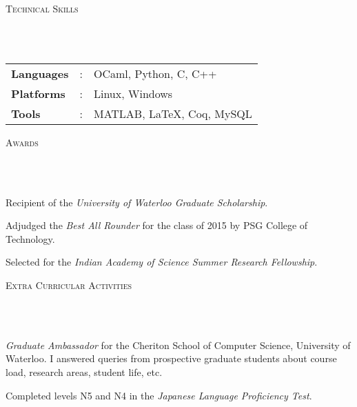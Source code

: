 \documentclass{article}
\newcommand{\header}[1]{{
\hspace*{-15pt}\vspace*{6pt} \textsc{#1}} \vspace*{-6pt} 
\lineunder
}
\newcommand{\lineunder}{
\vspace*{-8pt} \\ \hspace*{-18pt} 
\hrulefill \\
}
\renewcommand{\labelitemii}{
$\vcenter{\hbox{\tiny$\bullet$}}$\hspace*{-3pt}
}
\newenvironment{bullet-list-major}{
\begin{list}{\labelitemii}{\setlength\leftmargin{3pt} 
\topsep 0pt \itemsep -2pt}}{\vspace*{4pt}\end{list}
}
\begin{document}
\vspace*{4pt}%
\header{Technical Skills}
\begin{tabular}{l l l}

\textbf{Languages}&: & OCaml, Python, C, C++\\
\textbf{Platforms}&:  & Linux, Windows\\
\textbf{Tools}&:     &MATLAB, \LaTeX, Coq, MySQL
\end{tabular}


\vspace*{4pt}%
\header{Awards}
    \begin{bullet-list-major}
    \item Recipient of the \textit{University of Waterloo Graduate Scholarship}.
    \item Adjudged the \textit{Best All Rounder} for the class of 2015 by PSG College of
        Technology. 
    \item Selected for the \textit{Indian Academy of Science Summer Research
            Fellowship}.
    \end{bullet-list-major}

\vspace*{4pt}%
\header{Extra Curricular Activities}
    \begin{bullet-list-major}
    \item \textit{Graduate Ambassador} for the Cheriton School of Computer Science,
        University of Waterloo. I answered queries from prospective graduate
        students about course load, research areas, student life, etc.
    \item Completed levels N5 and N4 in the \textit{Japanese Language
            Proficiency Test}.
    \end{bullet-list-major}
\end{document}
